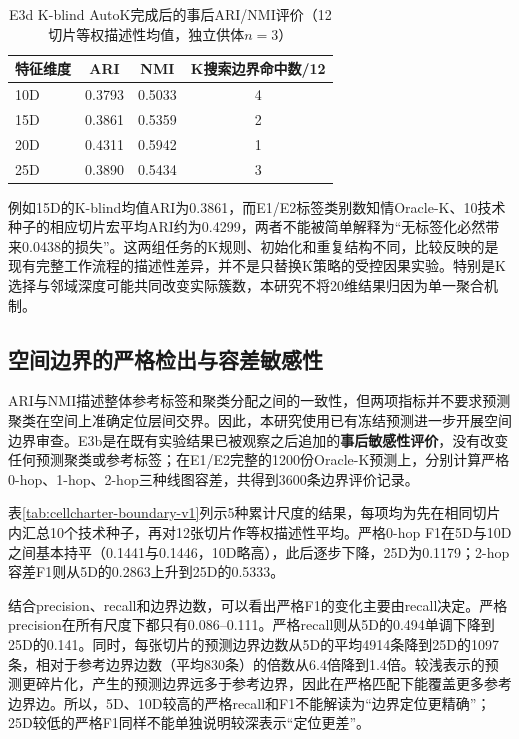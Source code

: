 \begin{table}[htbp]
\centering
\caption{E3d K-blind AutoK完成后的事后ARI/NMI评价（12切片等权描述性均值，独立供体$n=3$）}
\label{tab:cellcharter-e3d-v1}
\begin{tabular}{lccc}
\toprule
特征维度 & ARI & NMI & K搜索边界命中数/12\\
\midrule
10D & 0.3793 & 0.5033 & 4\\
15D & 0.3861 & 0.5359 & 2\\
20D & 0.4311 & 0.5942 & 1\\
25D & 0.3890 & 0.5434 & 3\\
\bottomrule
\end{tabular}
\end{table}

例如15D的K-blind均值ARI为0.3861，而E1/E2标签类别数知情Oracle-K、10技术种子的相应切片宏平均ARI约为0.4299，两者不能被简单解释为“无标签化必然带来0.0438的损失”。这两组任务的K规则、初始化和重复结构不同，比较反映的是现有完整工作流程的描述性差异，并不是只替换K策略的受控因果实验。特别是K选择与邻域深度可能共同改变实际簇数，本研究不将20维结果归因为单一聚合机制。

\subsection{空间边界的严格检出与容差敏感性}
\label{subsec:cellcharter-e3b-v1}

ARI与NMI描述整体参考标签和聚类分配之间的一致性，但两项指标并不要求预测聚类在空间上准确定位层间交界。因此，本研究使用已有冻结预测进一步开展空间边界审查。E3b是在既有实验结果已被观察之后追加的\textbf{事后敏感性评价}，没有改变任何预测聚类或参考标签；在E1/E2完整的1200份Oracle-K预测上，分别计算严格0-hop、1-hop、2-hop三种线图容差，共得到3600条边界评价记录。

表\ref{tab:cellcharter-boundary-v1}列示5种累计尺度的结果，每项均为先在相同切片内汇总10个技术种子，再对12张切片作等权描述性平均。严格0-hop F1在5D与10D之间基本持平（0.1441与0.1446，10D略高），此后逐步下降，25D为0.1179；2-hop容差F1则从5D的0.2863上升到25D的0.5333。

结合precision、recall和边界边数，可以看出严格F1的变化主要由recall决定。严格precision在所有尺度下都只有0.086--0.111。严格recall则从5D的0.494单调下降到25D的0.141。同时，每张切片的预测边界边数从5D的平均4914条降到25D的1097条，相对于参考边界边数（平均830条）的倍数从6.4倍降到1.4倍。较浅表示的预测更碎片化，产生的预测边界远多于参考边界，因此在严格匹配下能覆盖更多参考边界边。所以，5D、10D较高的严格recall和F1不能解读为“边界定位更精确”；25D较低的严格F1同样不能单独说明较深表示“定位更差”。

